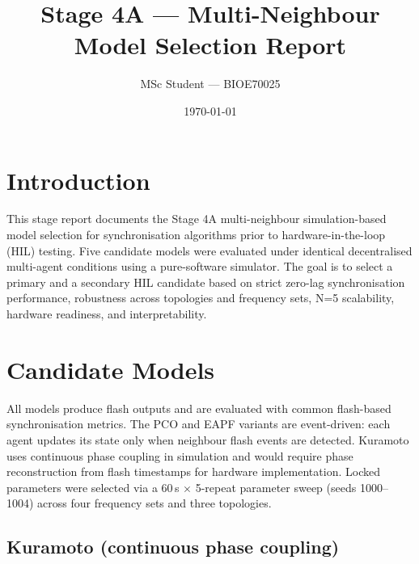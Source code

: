\documentclass[11pt,a4paper]{article}
\title{Stage 4A — Multi-Neighbour Model Selection Report}
\author{MSc Student — BIOE70025}
\date{\today}
\begin{document}
\maketitle

\section{Introduction}

This stage report documents the Stage 4A multi-neighbour simulation-based
model selection for synchronisation algorithms prior to hardware-in-the-loop
(HIL) testing.  Five candidate models were evaluated under identical
decentralised multi-agent conditions using a pure-software simulator.  The
goal is to select a primary and a secondary HIL candidate based on strict
zero-lag synchronisation performance, robustness across topologies and
frequency sets, N=5 scalability, hardware readiness, and interpretability.

\section{Candidate Models}

All models produce flash outputs and are evaluated with common flash-based
synchronisation metrics.  The PCO and EAPF variants are event-driven: each
agent updates its state only when neighbour flash events are detected.
Kuramoto uses continuous phase coupling in simulation and would require
phase reconstruction from flash timestamps for hardware implementation.
Locked parameters were selected via a 60\,s $\times$ 5-repeat parameter sweep
(seeds 1000--1004) across four frequency sets and three topologies.



\subsection{Kuramoto (continuous phase coupling)}
\end{document}
